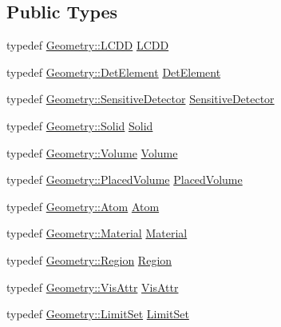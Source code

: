 \subsection*{Public Types}
\begin{DoxyCompactItemize}
\item 
typedef \hyperlink{class_d_d4hep_1_1_geometry_1_1_l_c_d_d}{Geometry::LCDD} \hyperlink{class_d_d4hep_1_1_simulation_1_1_geant4_mapping_a7b098323f9ea570a13d220fe3f09da41}{LCDD}
\item 
typedef \hyperlink{class_d_d4hep_1_1_geometry_1_1_det_element}{Geometry::DetElement} \hyperlink{class_d_d4hep_1_1_simulation_1_1_geant4_mapping_a58a1cf6fc60a0928c1048fb1d32fcea5}{DetElement}
\item 
typedef \hyperlink{class_d_d4hep_1_1_geometry_1_1_sensitive_detector}{Geometry::SensitiveDetector} \hyperlink{class_d_d4hep_1_1_simulation_1_1_geant4_mapping_ae27ee51d13bf8ae59e8bee3fcecdbc85}{SensitiveDetector}
\item 
typedef \hyperlink{class_d_d4hep_1_1_geometry_1_1_solid__type}{Geometry::Solid} \hyperlink{class_d_d4hep_1_1_simulation_1_1_geant4_mapping_ac94b8af2661de6ba577901ae8cdea3f9}{Solid}
\item 
typedef \hyperlink{class_d_d4hep_1_1_geometry_1_1_volume}{Geometry::Volume} \hyperlink{class_d_d4hep_1_1_simulation_1_1_geant4_mapping_a86c52918ea76c0cbd7a4bffb971f33a5}{Volume}
\item 
typedef \hyperlink{class_d_d4hep_1_1_geometry_1_1_placed_volume}{Geometry::PlacedVolume} \hyperlink{class_d_d4hep_1_1_simulation_1_1_geant4_mapping_a2cad95da5f969a6b67fb6d6944549ad6}{PlacedVolume}
\item 
typedef \hyperlink{class_d_d4hep_1_1_geometry_1_1_atom}{Geometry::Atom} \hyperlink{class_d_d4hep_1_1_simulation_1_1_geant4_mapping_aa33a3f44904c6184ee883c244baa9554}{Atom}
\item 
typedef \hyperlink{class_d_d4hep_1_1_geometry_1_1_material}{Geometry::Material} \hyperlink{class_d_d4hep_1_1_simulation_1_1_geant4_mapping_a2539031128388f894af24898eb6189a7}{Material}
\item 
typedef \hyperlink{class_d_d4hep_1_1_geometry_1_1_region}{Geometry::Region} \hyperlink{class_d_d4hep_1_1_simulation_1_1_geant4_mapping_a48f9337eb1105d5874835c20456a652d}{Region}
\item 
typedef \hyperlink{class_d_d4hep_1_1_geometry_1_1_vis_attr}{Geometry::VisAttr} \hyperlink{class_d_d4hep_1_1_simulation_1_1_geant4_mapping_aea00056d988cf94eb39b25514928e3a6}{VisAttr}
\item 
typedef \hyperlink{class_d_d4hep_1_1_geometry_1_1_limit_set}{Geometry::LimitSet} \hyperlink{class_d_d4hep_1_1_simulation_1_1_geant4_mapping_a274f93e912e70a162849adb21f54184e}{LimitSet}
\end{DoxyCompactItemize}
